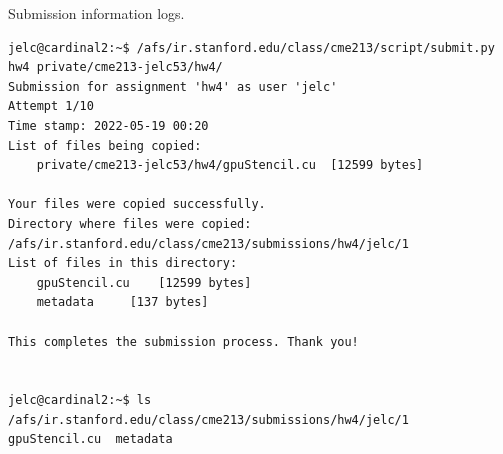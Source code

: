 \documentclass[12pt,letterpaper,twoside]{article}
\begin{document}
Submission information logs.
\begin{verbatim}
jelc@cardinal2:~$ /afs/ir.stanford.edu/class/cme213/script/submit.py hw4 private/cme213-jelc53/hw4/
Submission for assignment 'hw4' as user 'jelc'
Attempt 1/10
Time stamp: 2022-05-19 00:20
List of files being copied:
    private/cme213-jelc53/hw4/gpuStencil.cu	 [12599 bytes]

Your files were copied successfully.
Directory where files were copied: /afs/ir.stanford.edu/class/cme213/submissions/hw4/jelc/1
List of files in this directory:
    gpuStencil.cu	 [12599 bytes]
    metadata	 [137 bytes]

This completes the submission process. Thank you!
    

jelc@cardinal2:~$ ls /afs/ir.stanford.edu/class/cme213/submissions/hw4/jelc/1
gpuStencil.cu  metadata

\end{verbatim}
\end{document}
